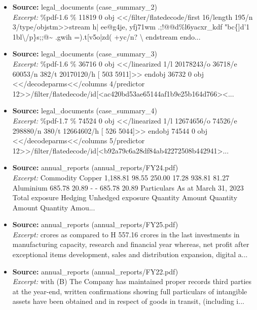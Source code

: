 \documentclass[11pt,a4paper]{article}
\begin{document}
\begin{itemize}
\item \textbf{Source:} legal\_documents (case\_summary\_2) \\ \textit{Excerpt:} \%pdf-1.6 \% 11819 0 obj <</filter/flatedecode/first 16/length 195/n 3/type/objstm>>stream h| ee@g4je, yfj71wm .;!@@d\%l6yacxr\_kdf "bc\{]d'1 1bl\textbackslash{}/p\}s;;@\textasciitilde{} .gwih =).t[v5o|zd( +yc/n? \textbackslash{} endstream endo...
\item \textbf{Source:} legal\_documents (case\_summary\_3) \\ \textit{Excerpt:} \%pdf-1.6 \% 36716 0 obj <</linearized 1/l 20178243/o 36718/e 60053/n 382/t 20170120/h [ 503 5911]>> endobj 36732 0 obj <</decodeparms<</columns 4/predictor 12>>/filter/flatedecode/id[<ac420bd53ae65144af1b9e25b164d766><...
\item \textbf{Source:} legal\_documents (case\_summary\_4) \\ \textit{Excerpt:} \%pdf-1.7 \% 74524 0 obj <</linearized 1/l 12674656/o 74526/e 298880/n 380/t 12664602/h [ 526 5044]>> endobj 74544 0 obj <</decodeparms<</columns 5/predictor 12>>/filter/flatedecode/id[<b92a79c6a28df84ab42272508b442941>...
\item \textbf{Source:} annual\_reports (annual\_reports/FY24.pdf) \\ \textit{Excerpt:} Commodity Copper 1,188.81 98.55 250.00 17.28 938.81 81.27 Aluminium 685.78 20.89 - - 685.78 20.89 Particulars As at March 31, 2023 Total exposure Hedging Unhedged exposure Quantity Amount Quantity Amount Quantity Amou...
\item \textbf{Source:} annual\_reports (annual\_reports/FY25.pdf) \\ \textit{Excerpt:} crores as compared to H 557.16 crores in the last investments in manufacturing capacity, research and financial year whereas, net profit after exceptional items development, sales and distribution expansion, digital a...
\item \textbf{Source:} annual\_reports (annual\_reports/FY22.pdf) \\ \textit{Excerpt:} with (B) The Company has maintained proper records third parties at the year-end, written confirmations showing full particulars of intangible assets have been obtained and in respect of goods in transit, (including i...
\end{itemize}
\end{document}
